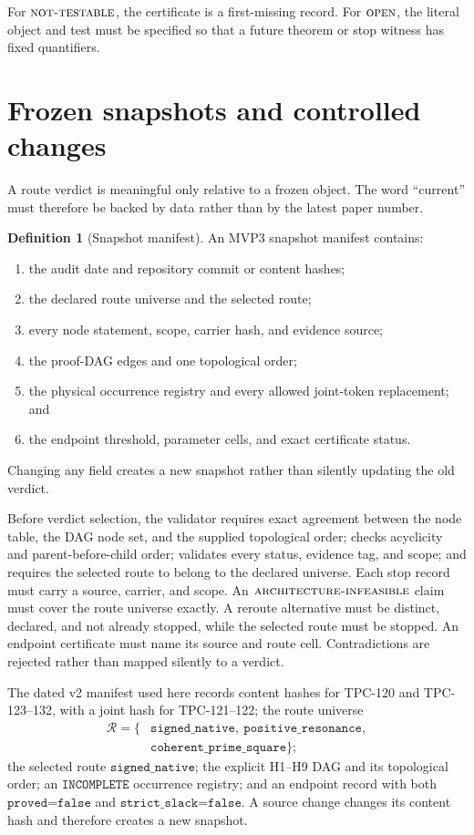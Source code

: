 \documentclass[11pt]{article}
\theoremstyle{definition}
\newtheorem{definition}[theorem]{Definition}
\theoremstyle{remark}
\newcommand{\AINF}{\textnormal{\textsc{architecture-infeasible}}}
\newcommand{\NT}{\textnormal{\textsc{not-testable}}}
\newcommand{\OPEN}{\textnormal{\textsc{open}}}
\begin{document}
For \(\NT\), the certificate is a first-missing record.  For
\(\OPEN\), the literal object and test must be specified so that a
future theorem or stop witness has fixed quantifiers.

\section{Frozen snapshots and controlled changes}

A route verdict is meaningful only relative to a frozen object.  The
word ``current'' must therefore be backed by data rather than by the
latest paper number.

\begin{definition}[Snapshot manifest]
\label{def:snapshot}
An MVP3 snapshot manifest contains:
\begin{enumerate}[label=(\roman*),leftmargin=2em]
\item the audit date and repository commit or content hashes;
\item the declared route universe and the selected route;
\item every node statement, scope, carrier hash, and evidence source;
\item the proof-DAG edges and one topological order;
\item the physical occurrence registry and every allowed joint-token
  replacement; and
\item the endpoint threshold, parameter cells, and exact certificate
  status.
\end{enumerate}
Changing any field creates a new snapshot rather than silently
updating the old verdict.
\end{definition}

Before verdict selection, the validator requires exact agreement
between the node table, the DAG node set, and the supplied topological
order; checks acyclicity and parent-before-child order; validates every
status, evidence tag, and scope; and requires the selected route to
belong to the declared universe.  Each stop record must carry a
source, carrier, and scope.  An \(\AINF\) claim must cover the route
universe exactly.  A reroute alternative must be distinct, declared,
and not already stopped, while the selected route must be stopped.
An endpoint certificate must name its source and route cell.
Contradictions are rejected rather than mapped silently to a verdict.

The dated v2 manifest used here records content hashes for TPC-120 and
TPC-123--132, with a joint hash for TPC-121--122; the route universe
\[
\begin{split}
\mathcal R=\{&
\texttt{signed\_native},\ \texttt{positive\_resonance},\\
&\texttt{coherent\_prime\_square}\};
\end{split}
\]
the selected route \(\texttt{signed\_native}\); the explicit H1--H9
DAG and its
topological order; an \(\texttt{INCOMPLETE}\) occurrence registry; and
an endpoint record with both \(\texttt{proved=false}\) and
\(\texttt{strict\_slack=false}\).  A source change changes its content
hash and therefore creates a new snapshot.
\end{document}
